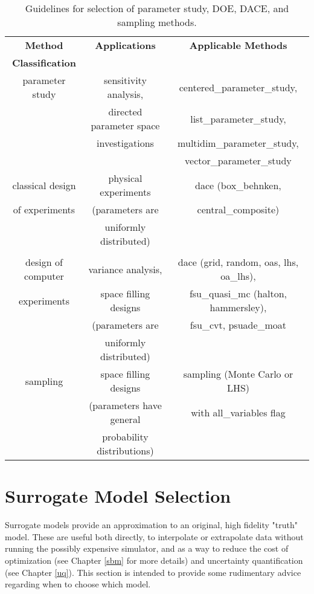 \begin{table}
\centering
\caption{Guidelines for selection of parameter study, DOE, DACE, and
sampling methods.}
\label{usage:guidepsdace}\vspace{2mm}
\begin{tabular}{|c|c|c|}
\hline
\textbf{Method} & \textbf{Applications} & \textbf{Applicable Methods} \\
\textbf{Classification} & & \\
\hline
parameter study & sensitivity analysis,    & centered\_parameter\_study, \\
                & directed parameter space & list\_parameter\_study, \\
                & investigations           & multidim\_parameter\_study, \\
                &                          & vector\_parameter\_study \\
\hline
classical design & physical experiments    & dace (box\_behnken, \\
of experiments   & (parameters are         & central\_composite) \\
                 & uniformly distributed)  & \\
                 &                         & \\
\hline
design of computer & variance analysis,     & dace (grid, random,
                                              oas, lhs, oa\_lhs), \\
experiments        & space filling designs  & fsu\_quasi\_mc (halton, 
                                              hammersley), \\
                   & (parameters are        & fsu\_cvt, psuade\_moat \\
                   & uniformly distributed) & \\
\hline
sampling           & space filling designs      & sampling
                                                  (Monte Carlo or LHS) \\
                   & (parameters have general   & with all\_variables flag \\
                   & probability distributions) & \\
\hline
\end{tabular}
\end{table}

\section{Surrogate Model Selection}\label{usage:model}
Surrogate models provide an approximation to an original, high 
fidelity "truth" model. These are useful both directly, to interpolate
or extrapolate data without running the possibly expensive simulator, 
and as a way to reduce the cost of optimization (see Chapter \ref{sbm} 
for more details) and uncertainty quantification (see Chapter \ref{uq}).
This section is intended to provide some rudimentary advice regarding 
when to choose which model.  

